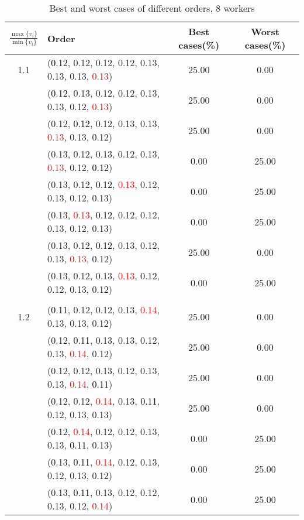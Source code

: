 \documentclass[10pt,a4paper]{report}
\begin{document}
\newpage\begin{center}
	\small
	\begin{longtable}{clcc}
		\caption{Best and worst cases of different orders, 8 workers}\\
		\toprule
		\setlength{\tabcolsep}{1mm}
		\renewcommand\baselinestretch{0.5}\selectfont
		$\frac{\max\{v_i\}}{\min\{v_i\}}$ & Order & Best cases(\%) & Worst cases(\%) \\
			\midrule		1.1			&(\textcolor{black}{0.12}, 0.12, 0.12, 0.12, 0.13, 0.13, 0.13, \textcolor{red}{0.13})&25.00&0.00\\
			&(\textcolor{black}{0.12}, 0.13, 0.12, 0.12, 0.13, 0.13, 0.12, \textcolor{red}{0.13})&25.00&0.00\\
			&(0.12, \textcolor{black}{0.12}, 0.12, 0.13, 0.13, \textcolor{red}{0.13}, 0.13, 0.12)&25.00&0.00\\
			&(0.13, 0.12, 0.13, 0.12, 0.13, \textcolor{red}{0.13}, 0.12, \textcolor{black}{0.12})&0.00&25.00\\
			&(0.13, 0.12, \textcolor{black}{0.12}, \textcolor{red}{0.13}, 0.12, 0.13, 0.12, 0.13)&0.00&25.00\\
			&(0.13, \textcolor{red}{0.13}, \textcolor{black}{0.12}, 0.12, 0.12, 0.13, 0.12, 0.13)&0.00&25.00\\
			&(0.13, 0.12, \textcolor{black}{0.12}, 0.13, 0.12, 0.13, \textcolor{red}{0.13}, 0.12)&25.00&0.00\\
			&(0.13, 0.12, 0.13, \textcolor{red}{0.13}, \textcolor{black}{0.12}, 0.12, 0.13, 0.12)&0.00&25.00\\
		&&&\\
		1.2			&(\textcolor{black}{0.11}, 0.12, 0.12, 0.13, \textcolor{red}{0.14}, 0.13, 0.13, 0.12)&25.00&0.00\\
			&(0.12, \textcolor{black}{0.11}, 0.13, 0.13, 0.12, 0.13, \textcolor{red}{0.14}, 0.12)&25.00&0.00\\
			&(0.12, 0.12, 0.13, 0.12, 0.13, 0.13, \textcolor{red}{0.14}, \textcolor{black}{0.11})&25.00&0.00\\
			&(0.12, 0.12, \textcolor{red}{0.14}, 0.13, \textcolor{black}{0.11}, 0.12, 0.13, 0.13)&25.00&0.00\\
			&(0.12, \textcolor{red}{0.14}, 0.12, 0.12, 0.13, 0.13, \textcolor{black}{0.11}, 0.13)&0.00&25.00\\
			&(0.13, \textcolor{black}{0.11}, \textcolor{red}{0.14}, 0.12, 0.13, 0.12, 0.13, 0.12)&0.00&25.00\\
			&(0.13, \textcolor{black}{0.11}, 0.13, 0.12, 0.12, 0.13, 0.12, \textcolor{red}{0.14})&0.00&25.00\\

\end{longtable}
\end{center}
\end{document}
